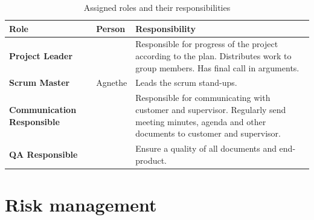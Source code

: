 \documentclass{article}
\newcommand{\ra}[1]{\renewcommand{\arraystretch}{#1}}
\begin{document}
\begin{table}\centering \ra{1.3}
    \caption{Assigned roles and their responsibilities}
    \label{tab:roles}
    \vspace{2mm}
    \begin{tabularx}{\textwidth}{llX}
    \toprule
    Role    & Person   & Responsibility \\
    \midrule
    \textbf{Project Leader}             & &
        Responsible for progress of the project according to the plan.
        Distributes work to group members.
        Has final call in arguments.\\
    \textbf{Scrum Master}             & Agnethe &
        Leads the scrum stand-ups. \\
    \textbf{Communication Responsible}  & &
        Responsible for communicating with customer and supervisor.
        Regularly send meeting minutes, agenda and other documents to customer and supervisor. \\ 
    \textbf{QA Responsible} & &
        Ensure a quality of all documents and end-product.
        \\ 
    \bottomrule
    \end{tabularx}
\end{table}



\section{Risk management}
\end{document}
